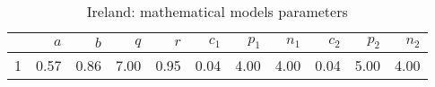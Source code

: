 \begin{table}[H]
\centering
\begin{tabular}{rrrrrrrrrrr}
  \hline
 & $a$ & $b$ & $q$ & $r$ & $c_1$ & $p_1$ & $n_1$ & $c_2$ & $p_2$ & $n_2$ \\ 
  \hline
1 & 0.57 & 0.86 & 7.00 & 0.95 & 0.04 & 4.00 & 4.00 & 0.04 & 5.00 & 4.00 \\ 
   \hline
\end{tabular}
\caption{Ireland: mathematical models parameters} 
\label{fig:Irelandmathmodelpars}
\end{table}
